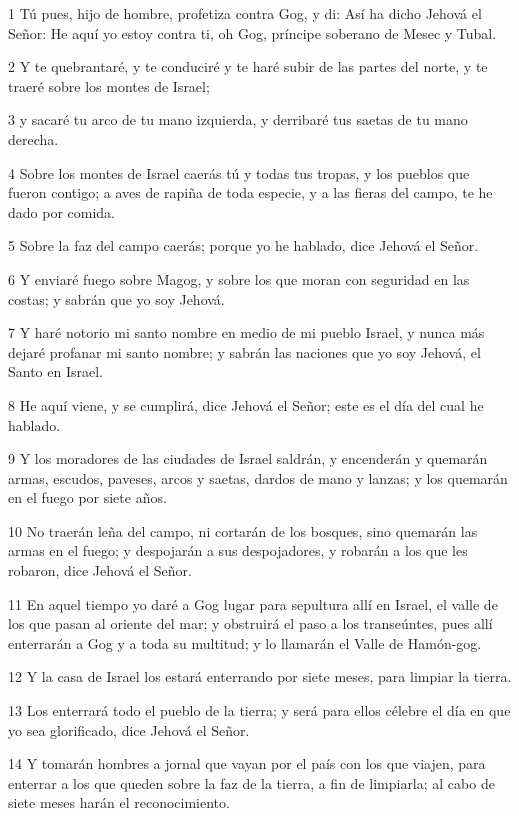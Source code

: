 \par 1 Tú pues, hijo de hombre, profetiza contra Gog, y di: Así ha dicho Jehová el Señor: He aquí yo estoy contra ti, oh Gog, príncipe soberano de Mesec y Tubal.
\par 2 Y te quebrantaré, y te conduciré y te haré subir de las partes del norte, y te traeré sobre los montes de Israel;
\par 3 y sacaré tu arco de tu mano izquierda, y derribaré tus saetas de tu mano derecha.
\par 4 Sobre los montes de Israel caerás tú y todas tus tropas, y los pueblos que fueron contigo; a aves de rapiña de toda especie, y a las fieras del campo, te he dado por comida.
\par 5 Sobre la faz del campo caerás; porque yo he hablado, dice Jehová el Señor.
\par 6 Y enviaré fuego sobre Magog, y sobre los que moran con seguridad en las costas; y sabrán que yo soy Jehová.
\par 7 Y haré notorio mi santo nombre en medio de mi pueblo Israel, y nunca más dejaré profanar mi santo nombre; y sabrán las naciones que yo soy Jehová, el Santo en Israel.
\par 8 He aquí viene, y se cumplirá, dice Jehová el Señor; este es el día del cual he hablado.
\par 9 Y los moradores de las ciudades de Israel saldrán, y encenderán y quemarán armas, escudos, paveses, arcos y saetas, dardos de mano y lanzas; y los quemarán en el fuego por siete años.
\par 10 No traerán leña del campo, ni cortarán de los bosques, sino quemarán las armas en el fuego; y despojarán a sus despojadores, y robarán a los que les robaron, dice Jehová el Señor.
\par 11 En aquel tiempo yo daré a Gog lugar para sepultura allí en Israel, el valle de los que pasan al oriente del mar; y obstruirá el paso a los transeúntes, pues allí enterrarán a Gog y a toda su multitud; y lo llamarán el Valle de Hamón-gog.
\par 12 Y la casa de Israel los estará enterrando por siete meses, para limpiar la tierra.
\par 13 Los enterrará todo el pueblo de la tierra; y será para ellos célebre el día en que yo sea glorificado, dice Jehová el Señor.
\par 14 Y tomarán hombres a jornal que vayan por el país con los que viajen, para enterrar a los que queden sobre la faz de la tierra, a fin de limpiarla; al cabo de siete meses harán el reconocimiento.
